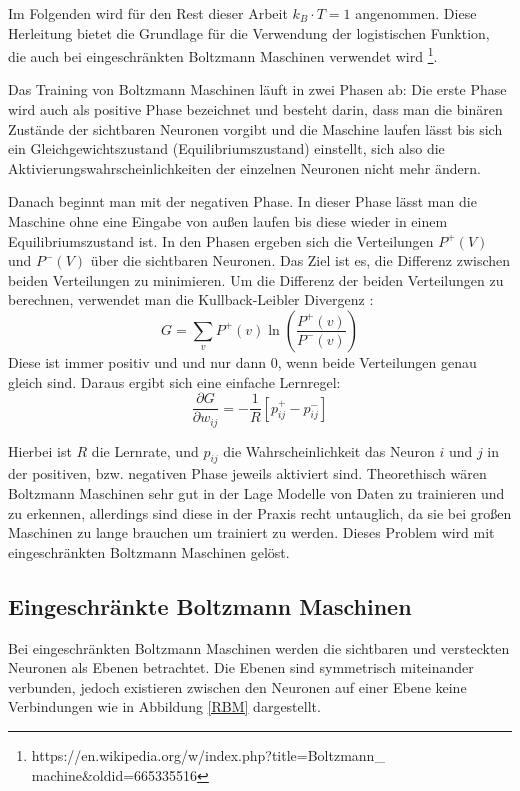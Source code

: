\documentclass[12pt]{article}
\begin{document}
Im Folgenden wird für den Rest dieser Arbeit $k_B \cdot T=1$ angenommen. Diese Herleitung bietet die Grundlage für die Verwendung der logistischen Funktion, die auch bei eingeschränkten Boltzmann Maschinen verwendet wird \footnote{https://en.wikipedia.org/w/index.php?title=Boltzmann\_ machine\&oldid=665335516}. 

Das Training von Boltzmann Maschinen läuft in zwei Phasen ab: Die erste Phase wird auch als positive Phase bezeichnet und besteht darin, dass man die binären Zustände der sichtbaren Neuronen vorgibt und die Maschine laufen lässt bis sich ein Gleichgewichtszustand (Equilibriumszustand) einstellt, sich also die Aktivierungswahrscheinlichkeiten der einzelnen Neuronen nicht mehr ändern. 

Danach beginnt man mit der negativen Phase. In dieser Phase lässt man die Maschine ohne eine Eingabe von außen laufen bis diese wieder in einem Equilibriumszustand ist. In den Phasen ergeben sich die Verteilungen $P^+(V)$ und $P^-(V)$ über die sichtbaren Neuronen. Das Ziel ist es, die Differenz zwischen beiden Verteilungen zu minimieren. Um die Differenz der beiden Verteilungen zu berechnen, verwendet man die Kullback-Leibler Divergenz \cite{KLD}:
\begin{equation}
G = \sum_{v}{P^{+}(v)\ln\left({\frac{P^{+}(v)}{P^{-}(v)}}\right)}
\end{equation} 
Diese ist immer positiv und und nur dann 0, wenn beide Verteilungen genau gleich sind. Daraus ergibt sich eine einfache Lernregel:
\begin{equation}
\frac{\partial{G}}{\partial{w_{ij}}} = -\frac{1}{R}[p_{ij}^{+}-p_{ij}^{-}]
\end{equation}

Hierbei ist $R$ die Lernrate, und $p_{ij}$ die Wahrscheinlichkeit das Neuron $i$ und $j$ in der positiven, bzw. negativen Phase jeweils aktiviert sind.
Theorethisch wären Boltzmann Maschinen sehr gut in der Lage Modelle von Daten zu trainieren und zu erkennen, allerdings sind diese in der Praxis recht untauglich, da sie bei großen Maschinen zu lange brauchen um trainiert zu werden. Dieses Problem wird mit eingeschränkten Boltzmann Maschinen gelöst.

\subsection{Eingeschränkte Boltzmann Maschinen}	
Bei eingeschränkten Boltzmann Maschinen werden die sichtbaren und versteckten Neuronen als Ebenen betrachtet. Die Ebenen sind symmetrisch miteinander verbunden, jedoch existieren zwischen den Neuronen auf einer Ebene keine Verbindungen wie in Abbildung \ref{RBM} dargestellt.
\end{document}
